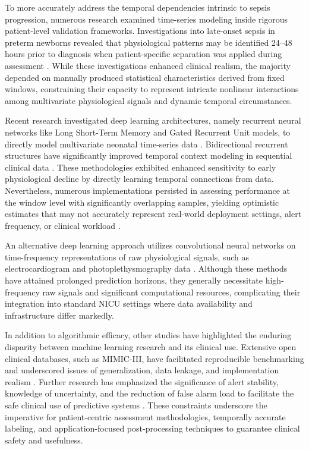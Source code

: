 \documentclass[conference]{IEEEtran}
\begin{document}
To more accurately address the temporal dependencies intrinsic to sepsis progression, numerous research examined time-series modeling inside rigorous patient-level validation frameworks. Investigations into late-onset sepsis in preterm newborns revealed that physiological patterns may be identified 24–48 hours prior to diagnosis when patient-specific separation was applied during assessment \cite{vital_sign_ml,los_ml_mdpi}. While these investigations enhanced clinical realism, the majority depended on manually produced statistical characteristics derived from fixed windows, constraining their capacity to represent intricate nonlinear interactions among multivariate physiological signals and dynamic temporal circumstances.

Recent research investigated deep learning architectures, namely recurrent neural networks like Long Short-Term Memory and Gated Recurrent Unit models, to directly model multivariate neonatal time-series data \cite{ehr_rnn_sepsis,Che2018RNNMissing}. Bidirectional recurrent structures have significantly improved temporal context modeling in sequential clinical data \cite{schuster1997}. These methodologies exhibited enhanced sensitivity to early physiological decline by directly learning temporal connections from data. Nevertheless, numerous implementations persisted in assessing performance at the window level with significantly overlapping samples, yielding optimistic estimates that may not accurately represent real-world deployment settings, alert frequency, or clinical workload \cite{Reyna2020PhysioNet}.

An alternative deep learning approach utilizes convolutional neural networks on time-frequency representations of raw physiological signals, such as electrocardiogram and photoplethysmography data \cite{cnn_psd_sepsis}. Although these methods have attained prolonged prediction horizons, they generally necessitate high-frequency raw signals and significant computational resources, complicating their integration into standard NICU settings where data availability and infrastructure differ markedly.

In addition to algorithmic efficacy, other studies have highlighted the enduring disparity between machine learning research and its clinical use. Extensive open clinical databases, such as MIMIC-III, have facilitated reproducible benchmarking and underscored issues of generalization, data leakage, and implementation realism \cite{Johnson2016MIMIC}. Further research has emphasized the significance of alert stability, knowledge of uncertainty, and the reduction of false alarm load to facilitate the safe clinical use of predictive systems \cite{Raghu2019ClinicalAI}. These constraints underscore the imperative for patient-centric assessment methodologies, temporally accurate labeling, and application-focused post-processing techniques to guarantee clinical safety and usefulness.
\end{document}
